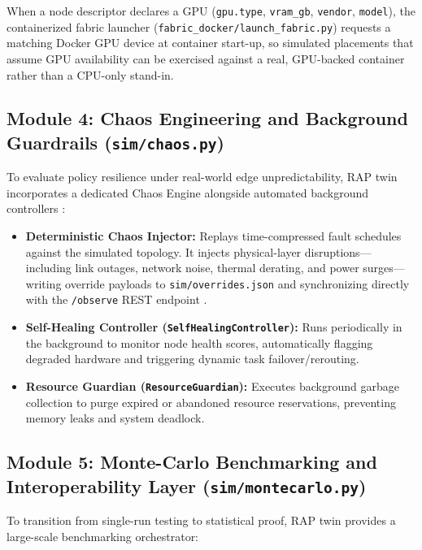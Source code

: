 \documentclass[twoside,twocolumn,10pt]{article}
\begin{document}
When a node descriptor declares a GPU (\texttt{gpu.type}, \texttt{vram\_gb}, \texttt{vendor}, \texttt{model}), the containerized fabric launcher (\texttt{fabric\_docker/launch\_fabric.py}) requests a matching Docker GPU device at container start-up, so simulated placements that assume GPU availability can be exercised against a real, GPU-backed container rather than a CPU-only stand-in.

\subsection{Module 4: Chaos Engineering and Background Guardrails (\texttt{sim/chaos.py})}
To evaluate policy resilience under real-world edge unpredictability, RAP twin incorporates a dedicated Chaos Engine alongside automated background controllers \cite{esen2026}:

\begin{itemize}
    \item \textbf{Deterministic Chaos Injector:} Replays time-compressed fault schedules against the simulated topology. It injects physical-layer disruptions—including link outages, network noise, thermal derating, and power surges—writing override payloads to \texttt{sim/overrides.json} and synchronizing directly with the \texttt{/observe} REST endpoint \cite{poltronieri2021}.
    \item \textbf{Self-Healing Controller (\texttt{SelfHealingController}):} Runs periodically in the background to monitor node health scores, automatically flagging degraded hardware and triggering dynamic task failover/rerouting.
    \item \textbf{Resource Guardian (\texttt{ResourceGuardian}):} Executes background garbage collection to purge expired or abandoned resource reservations, preventing memory leaks and system deadlock.
\end{itemize}

\subsection{Module 5: Monte-Carlo Benchmarking and Interoperability Layer (\texttt{sim/montecarlo.py})}
To transition from single-run testing to statistical proof, RAP twin provides a large-scale benchmarking orchestrator:
\end{document}
